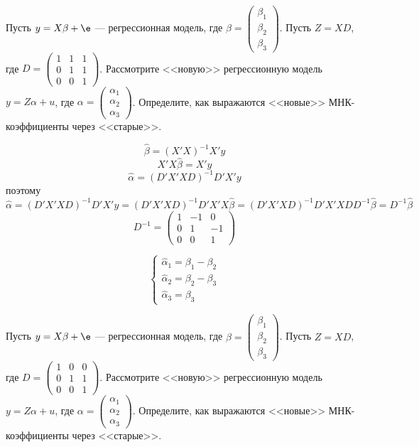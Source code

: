 \documentclass[pdftex,11pt,openany]{book}\usepackage[]{graphicx}\usepackage[]{color}
\begin{document}
\begin{problem}
Пусть $y = X\beta + \e$ --- регрессионная модель, где $\beta = \begin{pmatrix} \beta_1 \\ \beta_2 \\ \beta_3 \end{pmatrix}$. Пусть $Z = XD$, где $D = \begin{pmatrix} 1 & 1 & 1 \\ 0 & 1 & 1 \\ 0 & 0 & 1 \end{pmatrix}$. Рассмотрите <<новую>> регрессионную модель $y = Z\alpha + u$, где $\alpha = \begin{pmatrix} \alpha_1 \\ \alpha_2 \\ \alpha_3 \end{pmatrix}$. Определите, как выражаются <<новые>> МНК-коэффициенты через <<старые>>.

\end{problem}

\begin{solution}
\[\hat\beta=(X'X)^{-1}X'y\]
\[X'X\hat\beta=X'y\]
\[\hat\alpha=(D'X'XD)^{-1}D'X'y\]
поэтому
\[\hat\alpha=(D'X'XD)^{-1}D'X'y=(D'X'XD)^{-1}D'X'X\hat\beta=(D'X'XD)^{-1}D'X'XDD^{-1}\hat\beta=D^{-1}\hat\beta\]
\[D^{-1}=\left(\begin{array}{ccc}
1 & -1 & 0\\ 
0 & 1 & -1\\
0 & 0 & 1
\end{array}\right)\]

\[\begin{cases}
\hat\alpha_1=\beta_1-\beta_2\\
\hat\alpha_2=\beta_2-\beta_3\\
\hat\alpha_3=\beta_3
\end{cases}\]
\end{solution}


\begin{problem}
Пусть $y = X\beta + \e$ --- регрессионная модель, где $\beta = \begin{pmatrix} \beta_1 \\ \beta_2 \\ \beta_3 \end{pmatrix}$. Пусть $Z = XD$, где $D = \begin{pmatrix} 1 & 0 & 0 \\ 0 & 1 & 1 \\ 0 & 0 & 1 \end{pmatrix}$. Рассмотрите <<новую>> регрессионную модель $y = Z\alpha + u$, где $\alpha = \begin{pmatrix} \alpha_1 \\ \alpha_2 \\ \alpha_3 \end{pmatrix}$. Определите, как выражаются <<новые>> МНК-коэффициенты через <<старые>>.

\end{problem}
\end{document}
